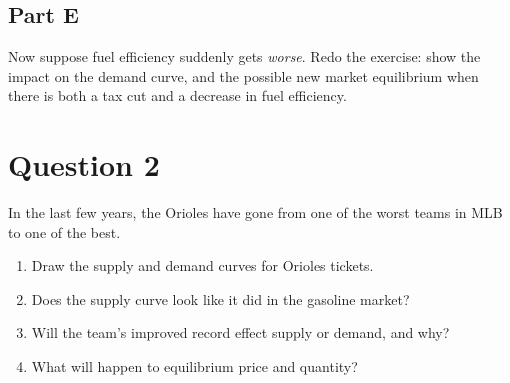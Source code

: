 \documentclass[12pt]{article}
\begin{document}
\subsection*{Part E}
Now suppose fuel efficiency suddenly gets \textit{worse}. Redo the exercise: show the impact on the demand curve, and the possible new market equilibrium when there is both a tax cut and a decrease in fuel efficiency.

\section*{Question 2}
In the last few years, the Orioles have gone from one of the worst teams in MLB to one of the best.

\begin{enumerate}
    \item Draw the supply and demand curves for Orioles tickets.
    \item Does the supply curve look like it did in the gasoline market?
    \item Will the team's improved record effect supply or demand, and why?
    \item What will happen to equilibrium price and quantity?
\end{enumerate}
\end{document}
